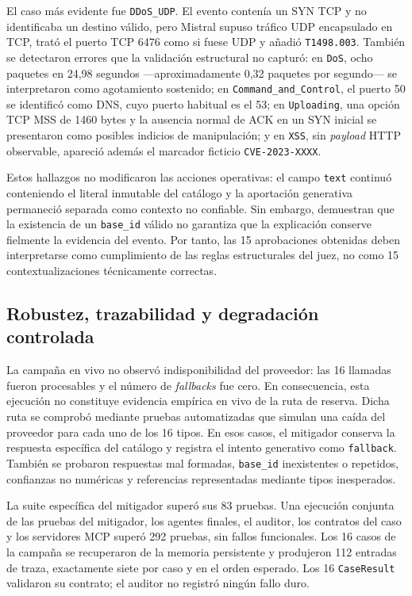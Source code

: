 El caso más evidente fue \texttt{DDoS\_UDP}. El evento contenía un SYN TCP y
no identificaba un destino válido, pero Mistral supuso tráfico UDP encapsulado
en TCP, trató el puerto TCP 6476 como si fuese UDP y añadió
\texttt{T1498.003}. También se detectaron errores que la validación estructural
no capturó: en \texttt{DoS}, ocho paquetes en 24,98 segundos
---aproximadamente 0,32 paquetes por segundo--- se interpretaron como
agotamiento sostenido; en \texttt{Command\_and\_Control}, el puerto 50 se
identificó como DNS, cuyo puerto habitual es el 53; en \texttt{Uploading}, una
opción TCP MSS de 1460 bytes y la ausencia normal de ACK en un SYN inicial se
presentaron como posibles indicios de manipulación; y en \texttt{XSS}, sin
\textit{payload} HTTP observable, apareció además el marcador ficticio
\texttt{CVE-2023-XXXX}.

Estos hallazgos no modificaron las acciones operativas: el campo \texttt{text}
continuó conteniendo el literal inmutable del catálogo y la aportación
generativa permaneció separada como contexto no confiable. Sin embargo,
demuestran que la existencia de un \texttt{base\_id} válido no garantiza que
la explicación conserve fielmente la evidencia del evento. Por tanto, las 15
aprobaciones obtenidas deben interpretarse como cumplimiento de las reglas
estructurales del juez, no como 15 contextualizaciones técnicamente correctas.

\subsection{Robustez, trazabilidad y degradación controlada}

La campaña en vivo no observó indisponibilidad del proveedor: las 16 llamadas
fueron procesables y el número de \textit{fallbacks} fue cero. En consecuencia,
esta ejecución no constituye evidencia empírica en vivo de la ruta de reserva.
Dicha ruta se comprobó mediante pruebas automatizadas que simulan una caída del
proveedor para cada uno de los 16 tipos. En esos casos, el mitigador conserva
la respuesta específica del catálogo y registra el intento generativo como
\texttt{fallback}. También se probaron respuestas mal formadas,
\texttt{base\_id} inexistentes o repetidos, confianzas no numéricas y
referencias representadas mediante tipos inesperados.

La suite específica del mitigador superó sus 83 pruebas. Una ejecución conjunta
de las pruebas del mitigador, los agentes finales, el auditor, los contratos del
caso y los servidores MCP superó 292 pruebas, sin fallos funcionales. Los 16
casos de la campaña se recuperaron de la memoria persistente y produjeron 112
entradas de traza, exactamente siete por caso y en el orden esperado. Los 16
\texttt{CaseResult} validaron su contrato; el auditor no registró ningún fallo
duro.

